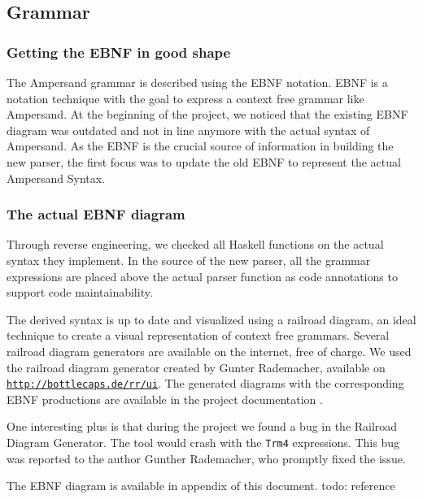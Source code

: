 
\subsection{Grammar}
\label{analysis:grammar}

\subsubsection{Getting the EBNF in good shape}
%
%
The Ampersand grammar is described using the EBNF notation. 
EBNF is a notation technique with the goal to express a context free grammar like Ampersand.
At the beginning of the project, we noticed that the existing EBNF diagram was outdated and not in line anymore with the actual syntax of Ampersand.
As the EBNF is the crucial source of information in building the new parser, the first focus was to update the old EBNF to represent the actual Ampersand Syntax.

\subsubsection{The actual EBNF diagram}
Through reverse engineering, we checked all Haskell functions on the actual syntax they implement.
In the source of the new parser, all the grammar expressions are placed above the actual parser function as code annotations to support code maintainability.

The derived syntax is up to date and visualized using a railroad diagram, an ideal technique to create a visual representation of context free grammars.
Several railroad diagram generators are available on the internet, free of charge.
We used the railroad diagram generator created by Gunter Rademacher, available on \texttt{\url{http://bottlecaps.de/rr/ui}}.
The generated diagrams with the corresponding EBNF productions are available in the project documentation .

One interesting plus is that during the project we found a bug in the Railroad Diagram Generator.
The tool would crash with the \texttt{Trm4} expressions.
This bug was reported to the author Gunther Rademacher, who promptly fixed the issue.

The EBNF diagram is available in appendix of this document. todo: reference
